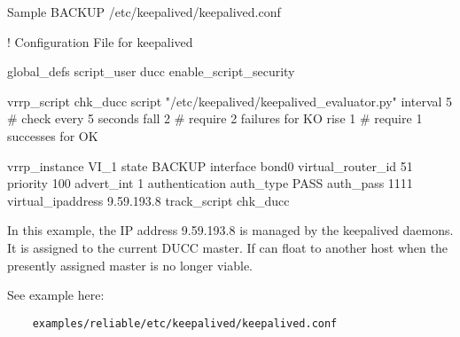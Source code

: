 \begin{minipage}{\textwidth}

	Sample BACKUP /etc/keepalived/keepalived.conf
	
	\begin{greybatim}
	
! Configuration File for keepalived

global_defs {
	script_user ducc 
	enable_script_security
}

vrrp_script chk_ducc {
  script       "/etc/keepalived/keepalived_evaluator.py"
  interval 5   # check every 5 seconds
  fall 2       # require 2 failures for KO
  rise 1       # require 1 successes for OK
}

vrrp_instance VI_1 {
    state BACKUP
    interface bond0
    virtual_router_id 51
    priority 100
    advert_int 1
    authentication {
        auth_type PASS
        auth_pass 1111
    }
    virtual_ipaddress {
        9.59.193.8
    }
    track_script {
    	chk_ducc
  	}
}

   	\end{greybatim}
   	
\end{minipage}

	\medskip
	In this example, the IP address 9.59.193.8 is managed by the keepalived daemons.
   	It is assigned to the current DUCC master.
   	If can float to another host when the presently assigned master is no longer viable.

	\medskip
	See example here:
	\begin{verbatim}
    examples/reliable/etc/keepalived/keepalived.conf
   	\end{verbatim}

